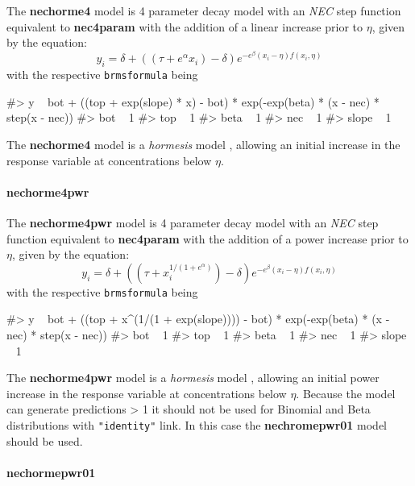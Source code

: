 The \textbf{nechorme4} model is 4 parameter decay model with an
\emph{NEC} step function equivalent to \textbf{nec4param} with the
addition of a linear increase prior to \(\eta\), given by the equation:
\[y_i = \delta + ((\tau + e^{\alpha} x_i) - \delta ) e^{-e^{\beta} \left(x_i - \eta \right) f(x_i, \eta)}\]
with the respective \texttt{brmsformula} being

\begin{Schunk}
\begin{Soutput}
#> y ~ bot + ((top + exp(slope) * x) - bot) * exp(-exp(beta) * (x - nec) * step(x - nec)) 
#> bot ~ 1
#> top ~ 1
#> beta ~ 1
#> nec ~ 1
#> slope ~ 1
\end{Soutput}
\end{Schunk}

The \textbf{nechorme4} model is a \emph{hormesis} model
\citep{Mattson2008}, allowing an initial increase in the response
variable at concentrations below \(\eta\).

\hypertarget{nechorme4pwr}{%
\paragraph{nechorme4pwr}\label{nechorme4pwr}}

The \textbf{nechorme4pwr} model is 4 parameter decay model with an
\emph{NEC} step function equivalent to \textbf{nec4param} with the
addition of a power increase prior to \(\eta\), given by the equation:
\[y_i = \delta + ((\tau + x_i^{1/(1+e^{\alpha})}) - \delta) e^{-e^{\beta} \left(x_i - \eta \right) f(x_i, \eta)}\]
with the respective \texttt{brmsformula} being

\begin{Schunk}
\begin{Soutput}
#> y ~ bot + ((top + x^(1/(1 + exp(slope)))) - bot) * exp(-exp(beta) * (x - nec) * step(x - nec)) 
#> bot ~ 1
#> top ~ 1
#> beta ~ 1
#> nec ~ 1
#> slope ~ 1
\end{Soutput}
\end{Schunk}

The \textbf{nechorme4pwr} model is a \emph{hormesis} model
\citep{Mattson2008}, allowing an initial power increase in the response
variable at concentrations below \(\eta\). Because the model can
generate predictions \textgreater{} 1 it should not be used for Binomial
and Beta distributions with \texttt{"identity"} link. In this case the
\textbf{nechromepwr01} model should be used.

\hypertarget{nechormepwr01}{%
\paragraph{nechormepwr01}\label{nechormepwr01}}

